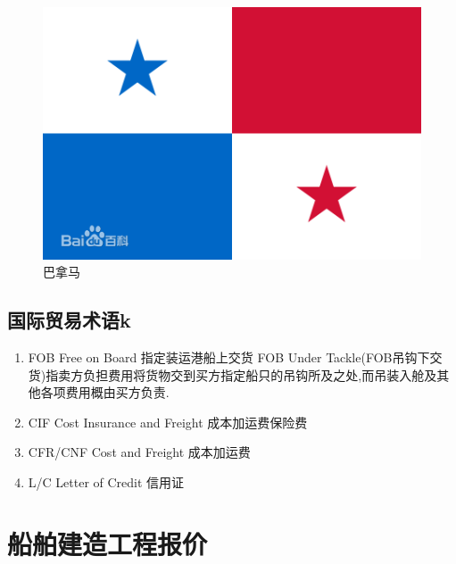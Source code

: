 \documentclass[UTF8,a4paper]{ctexart}
\begin{document}
\begin{figure}
		   		\includegraphics[scale=0.3,trim=0 0 0 0]{panama}
		   		\caption{巴拿马}
		   	\end{figure}
		\subsection{国际贸易术语k}
			\begin{enumerate}[.]
				\item FOB Free on Board 指定装运港船上交货 FOB Under Tackle(FOB吊钩下交货)指卖方负担费用将货物交到买方指定船只的吊钩所及之处,而吊装入舱及其他各项费用概由买方负责.
				\item CIF Cost Insurance and Freight 成本加运费保险费
				\item CFR/CNF Cost and Freight 成本加运费
				\item L/C Letter of Credit 信用证
				
			\end{enumerate}

		
	\section{船舶建造工程报价}
\end{document}
